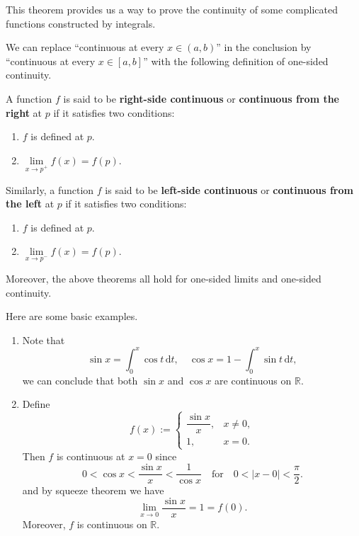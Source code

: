 \documentclass[a4paper]{ctexart}
\begin{document}
	\begin{myrmk}
		This theorem provides us a way to prove the continuity of some complicated functions constructed by integrals.

		We can replace ``continuous at every $x\in(a,b)$'' in the conclusion by ``continuous at every $x\in[a,b]$'' with the following definition of one-sided continuity.
	\end{myrmk}
	\begin{mydef}
		A function $f$ is said to be \textbf{right-side continuous} or \textbf{continuous from the right} at $p$ if it satisfies two conditions:
		\begin{enumerate}
			\item $f$ is defined at $p$.
			\item $\lim\limits_{x\to p^+}f(x)=f(p).$
		\end{enumerate}
		
		Similarly, a function $f$ is said to be \textbf{left-side continuous} or \textbf{continuous from the left} at $p$ if it satisfies two conditions:
		\begin{enumerate}
			\item $f$ is defined at $p$.
			\item $\lim\limits_{x\to p^-}f(x)=f(p).$
		\end{enumerate}
	\end{mydef}
	\begin{myrmk}
		Moreover, the above theorems all hold for one-sided limits and one-sided continuity.
	\end{myrmk}
	\begin{myex}
		Here are some basic examples.
		\begin{enumerate}
			\item Note that
			\[
			\sin x = \int_0^x \cos t\,\mathrm{d}t,\quad
			\cos x = 1 - \int_0^x \sin t\,\mathrm{d}t,
			\]
			we can conclude that both $\sin x$ and $\cos x$ are continuous on $\mathbb{R}$.
			\item Define
			\[
			f(x):=
			\begin{cases}
				\dfrac{\sin x}{x}, & x \neq 0,\\[6pt]
				1,  & x = 0.
			\end{cases}
			\]
			Then $f$ is continuous at $x=0$ since
			\[
			0<\cos x<\frac{\sin x}{x}<\frac{1}{\cos x}\quad \text{for}\quad 0<|x-0|<\frac{\pi}{2}.
			\]
			and by squeeze theorem we have
			\[
			\lim_{x\to 0} \frac{\sin x}{x}=1=f(0).
			\]
			Moreover, $f$ is continuous on $\mathbb{R}$.
		\end{enumerate}
	\end{myex}
\end{document}
